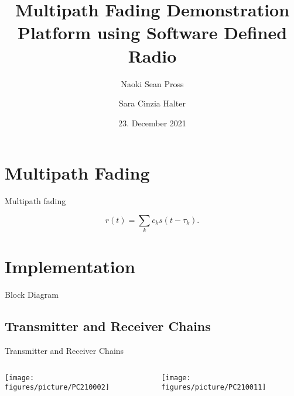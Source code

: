 \documentclass[xetex, onlymath, handout]{beamer}
\title{Multipath Fading Demonstration Platform using Software Defined Radio}
\author{Naoki Sean Pross \and Sara Cinzia Halter}
\date{23. December 2021}
\institute[OST]{OST FHO Campus Rapperswil}
\begin{document}
\frame{
  \maketitle
}

\section{Multipath Fading}

\begin{frame}{Multipath fading}
	\begin{figure}
		\centering
		
	\end{figure}
  \vspace{\baselineskip}
  \[
    r(t) = \sum_k c_k s(t - \tau_k).
  \]
\end{frame}



\section{Implementation}

\begin{frame}{Block Diagram}
	\begin{figure}
		\centering
		\resizebox{.9\linewidth}{!}{
			
		}
		
	\end{figure}
\end{frame}
	
\subsection{Transmitter and Receiver Chains}

\begin{frame}{Transmitter and Receiver Chains}
	\begin{columns}
		    \begin{column}{.5\linewidth}
		    \centering
		     \texttt{[image: figures/picture/PC210002]}
		    \end{column}
		    \begin{column}{.5\linewidth}
		      \begin{figure}
		      	\centering
		        \texttt{[image: figures/picture/PC210011]}
		      \end{figure}
		    \end{column}
	 \end{columns}
\end{frame}
\end{document}
